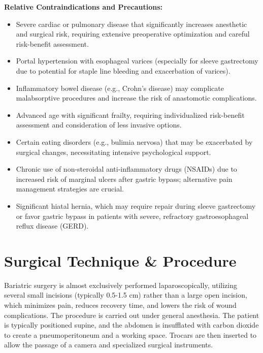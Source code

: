 \textbf{Relative Contraindications and Precautions:}
\begin{itemize}
  \item Severe cardiac or pulmonary disease that significantly increases anesthetic and surgical risk, requiring extensive preoperative optimization and careful risk-benefit assessment.
  \item Portal hypertension with esophageal varices (especially for sleeve gastrectomy due to potential for staple line bleeding and exacerbation of varices).
  \item Inflammatory bowel disease (e.g., Crohn's disease) may complicate malabsorptive procedures and increase the risk of anastomotic complications.
  \item Advanced age with significant frailty, requiring individualized risk-benefit assessment and consideration of less invasive options.
  \item Certain eating disorders (e.g., bulimia nervosa) that may be exacerbated by surgical changes, necessitating intensive psychological support.
  \item Chronic use of non-steroidal anti-inflammatory drugs (NSAIDs) due to increased risk of marginal ulcers after gastric bypass; alternative pain management strategies are crucial.
  \item Significant hiatal hernia, which may require repair during sleeve gastrectomy or favor gastric bypass in patients with severe, refractory gastroesophageal reflux disease (GERD).
\end{itemize}

\section*{Surgical Technique \& Procedure}
Bariatric surgery is almost exclusively performed laparoscopically, utilizing several small incisions (typically 0.5-1.5 cm) rather than a large open incision, which minimizes pain, reduces recovery time, and lowers the risk of wound complications. The procedure is carried out under general anesthesia. The patient is typically positioned supine, and the abdomen is insufflated with carbon dioxide to create a pneumoperitoneum and a working space. Trocars are then inserted to allow the passage of a camera and specialized surgical instruments.


